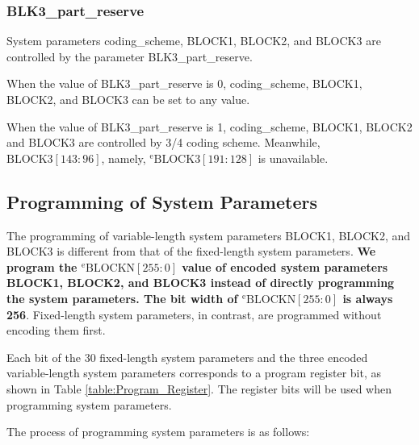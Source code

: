 \documentclass[main\_\_EN.tex]{subfiles}
\begin{document}


\hypertarget{BLK3_part_reserve}{\subsubsection{BLK3\_part\_reserve}}\label{BLK3}

System parameters coding\_scheme, BLOCK1, BLOCK2, and BLOCK3 are controlled by the parameter BLK3\_part\_reserve.

When the value of BLK3\_part\_reserve is 0, coding\_scheme, BLOCK1, BLOCK2, and BLOCK3 can be set to any value.

When the value of BLK3\_part\_reserve is 1, coding\_scheme, BLOCK1, BLOCK2 and BLOCK3 are controlled by 3/4 coding scheme.
Meanwhile,
\begin{math}\mathrm{BLOCK3}[143\!:\!96]\end{math}, namely,
$^{\mathrm{e}}\mathrm{BLOCK3}[191\!:\!128]$
is unavailable.

\subsection{Programming of System Parameters}

\hypertarget{program_BLOCKN}{}
The programming of variable-length system parameters BLOCK1, BLOCK2, and BLOCK3 is different from that of the fixed-length system parameters.
\textbf{We program the \begin{math}{}^{\mathrm{e}}\mathrm{BLOCKN}[255\!:\!0]\end{math} value of encoded system parameters BLOCK1, BLOCK2, and BLOCK3 instead of directly programming the system parameters. The bit width of \begin{math}{}^{\mathrm{e}}\mathrm{BLOCKN}[255\!:\!0]\end{math} is always 256}.
Fixed-length system parameters, in contrast, are programmed without encoding them first.

Each bit of the 30 fixed-length system parameters and the three encoded variable-length system parameters corresponds to a program register bit, as shown in Table \ref{table:Program_Register}. The register bits will be used when programming system parameters.



The process of programming system parameters is as follows:
\end{document}
